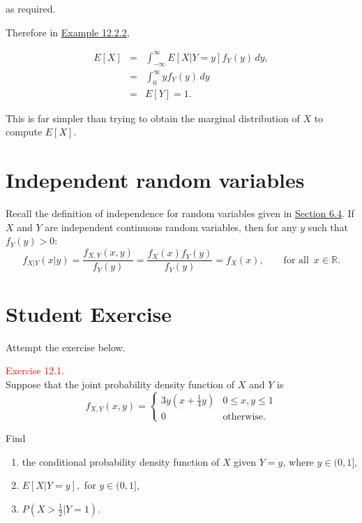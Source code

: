\documentclass[
]{book}
\providecommand{\tightlist}{%
  \setlength{\itemsep}{0pt}\setlength{\parskip}{0pt}}
\begin{document}
as required.

Therefore in \protect\hyperlink{CondDis:exer:cond_example}{Example 12.2.2},

\begin{eqnarray*}
E [X] 
&=& \int_{-\infty}^\infty E[X|Y=y] f_Y (y) \, dy,  \\  
&=& \int_0^\infty y f_Y (y) \, dy  \\  
&=& E[Y] =1.
\end{eqnarray*}

This is far simpler than trying to obtain the marginal distribution of \(X\) to compute \(E[X]\).

\hypertarget{CondDis:Independence}{%
\section{Independent random variables}\label{CondDis:Independence}}

Recall the definition of independence for random variables given in \protect\hyperlink{jointdis:independent}{Section 6.4}. If \(X\) and \(Y\) are independent continuous random variables, then for any \(y\) such that \(f_Y(y)>0\):\\

\[f_{X|Y}(x|y) = \frac{f_{X,Y}(x,y)}{f_Y(y)} = \frac{f_X(x)f_Y(y)}{f_Y(y)} = f_X(x), \qquad  \mbox{for all }\,x\in\mathbb R. \]

\hypertarget{CondDis:exer}{%
\section*{\texorpdfstring{{\textbf{Student Exercise}}}{Student Exercise}}\label{CondDis:exer}}

Attempt the exercise below.

\hypertarget{exer12:1}{}
\textcolor{red}{Exercise 12.1.}\\
Suppose that the joint probability density function of \(X\) and \(Y\) is\\

\[ f_{X,Y}(x,y) = \begin{cases} 3y(x+\frac{1}{4}y) & 0 \leq x,y \leq 1 \\ 0 & \text{otherwise.} \end{cases} \]

Find

\begin{enumerate}
\def\labelenumi{(\alph{enumi})}
\tightlist
\item
  the conditional probability density function of \(X\) given \(Y=y\), where \(y \in (0,1]\),\\
\item
  \(E[X|Y=y],\) for \(y \in (0,1]\),\\
\item
  \(P(X>\frac{1}{2} | Y=1)\).\\
\end{enumerate}
\end{document}
